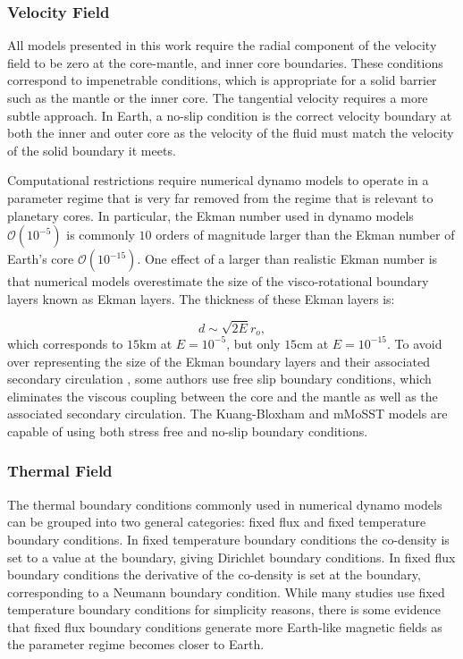 \subsubsection{Velocity Field}
All models presented in this work require the radial component of the velocity field to be zero at the core-mantle, and inner core boundaries. These conditions correspond to  impenetrable conditions, which is appropriate for a solid barrier such as the mantle or the inner core. The tangential velocity requires a more subtle approach. In Earth, a no-slip  condition is the correct velocity boundary at both the inner and outer core as the velocity of the fluid must match the velocity of the solid boundary it meets. 

Computational restrictions require numerical dynamo models to operate in a parameter regime that is very far removed from the regime that is relevant to planetary cores. In particular, the Ekman number used in dynamo models $\mathcal{O}\left( 10^{-5} \right)$ is commonly $10$ orders of magnitude larger than the Ekman number of Earth's core $\mathcal{O}\left(10^{-15}\right)$. One effect of a larger than realistic Ekman number is that numerical models overestimate the size of the visco-rotational boundary layers known as Ekman layers. The thickness of these Ekman layers is:

\begin{equation}
d\sim \sqrt{2E} r_{o},
\end{equation}
which corresponds to $15$km at $E=10^{-5}$, but only $15$cm at $E=10^{-15}$. To avoid over representing the size of the Ekman boundary layers and their associated secondary circulation \citep{gubbins2007}, some authors \citep{kuangandbloxham1999} use free slip boundary conditions, which eliminates the viscous coupling between the core and the mantle as well as the associated secondary circulation. The Kuang-Bloxham and mMoSST models are capable of using both stress free and no-slip boundary conditions. 

\subsubsection{Thermal Field}
The thermal boundary conditions commonly used in numerical dynamo models can be grouped into two general categories: fixed flux and fixed temperature boundary conditions. In fixed temperature boundary conditions the co-density is set to a value at the boundary, giving Dirichlet boundary conditions. In fixed flux boundary conditions the derivative of the co-density is set at the boundary, corresponding to a Neumann boundary condition. While many studies use fixed temperature boundary conditions for simplicity reasons, there is some evidence \citep{sakuraba2009} that fixed flux boundary conditions generate more Earth-like magnetic fields as the parameter regime becomes closer to Earth.

